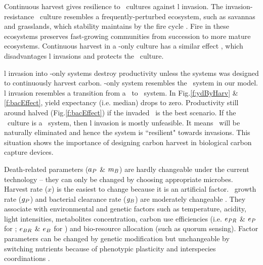 \documentclass[../thesis.tex]{subfiles} %
\begin{document}
Continuous harvest gives resilience to \phy\ cultures against \bac l invasion.  The invasion-resistance \phy\ culture resembles a frequently-perturbed ecosystem, such as savannas and grasslands, which stability maintains by the fire cycle \autocite{dass2018grasslands,trollope1984fire}.  Fire in these ecosystems preserves fast-growing communities \autocite{trollope1984fire} from succession to more mature ecosystems.  Continuous harvest in a \phy-only culture has a similar effect \autocite{sharp2017robust}, which disadvantages \bac l invasions and protects the \phy\ culture.

\Bac l invasion into \phy-only systems destroy productivity unless the systems was designed to continuously harvest carbon.  \Phy-only system resembles the \PoN\ system in our model.  \Bac l invasion resembles a transition from a \PoN\ to \PBN\ system.  In Fig.\ref{f:ydByHarv} \& \ref{f:bacEffect}, yield expectancy (i.e. median) drops to zero.  Productivity still around halved (Fig.\ref{f:bacEffect}) if the invaded \bac\ is the best scenario.  If the \phy\ culture is a \PoH\ system, then \bac l invasion is mostly unfeasible.  It means \bac\ will be naturally eliminated and hence the system is ``resilient" towards invasions.  This situation shows the importance of designing carbon harvest in biological carbon capture devices.

Death-related parameters ($a_P$ \& $m_B$) are hardly changeable under the current technology -- they can only be changed by choosing appropriate microbes.  Harvest rate ($x$) is the easiest to change because it is an artificial factor.  \Phy\ growth rate ($g_P$) and bacterial clearance rate ($g_B$) are moderately changeable \autocite{park2020potential}.  They associate with environmental and genetic factors such as temperature, acidity, light intensities, metabolites concentration, carbon use efficiencies (i.e. $e_{PR}$ \& $e_P$ for \phy; $e_{BR}$ \& $e_B$ for \bac) and bio-resource allocation (such as quorum sensing).  Factor parameters can be changed by genetic modification \autocite{moniruzzaman1996ethanol} but unchangeable by switching nutrients because of phenotypic plasticity \autocite{j1989respiration,bratbak1985phytoplankton,samejima1958heterotrophic} and interspecies coordinations \autocite{beliaev2014inference,amin2012interactions}.
\end{document}
